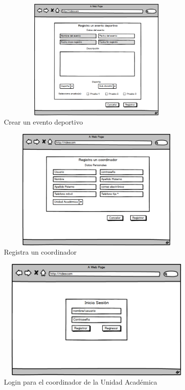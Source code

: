 		\begin{figure}[hbt!]
			\centering
			\includegraphics[width=10cm, height=6cm]{Imagenes/Disenos/p6Creareventodeportivo.png}
			\caption{Crear un evento deportivo}
			\label{Creareventodeportivo}
		\end{figure}
			\pagebreak
	
		\begin{figure}[hbt!]
			\centering
			\includegraphics[width=10cm, height=6cm]{Imagenes/Disenos/p7Registrocoordinador.png}
			\caption{Registra un coordinador}
			\label{Registrocoordinador}
		\end{figure}
	
		\begin{figure}[hbt!]
			\centering
			\includegraphics[width=10cm, height=6cm]{Imagenes/Disenos/p8LogincoordUA.png}
			\caption{Login para el coordinador de la Unidad Académica}
			\label{LogincoordUA}
		\end{figure}
	
